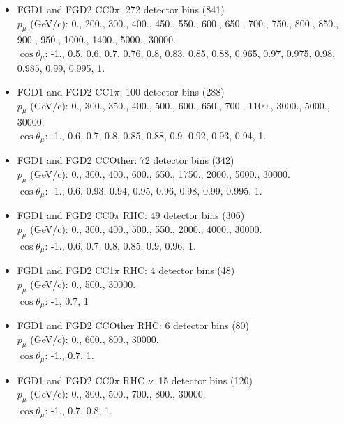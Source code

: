 \begin{itemize}
  \item FGD1 and FGD2 CC0$\pi$: 272 detector bins (841) \\
    $p_\mu$ (GeV/c): 0., 200., 300., 400., 450., 550., 600., 650., 700., 750., 800., 850., 900., 950., 1000., 1400., 5000., 30000. \\
    $\cos\theta_\mu$: -1., 0.5, 0.6, 0.7, 0.76, 0.8, 0.83, 0.85, 0.88, 0.965, 0.97, 0.975, 0.98, 0.985, 0.99, 0.995, 1. \\

  \item FGD1 and FGD2 CC1$\pi$: 100 detector bins (288) \\
    $p_\mu$ (GeV/c): 0., 300., 350., 400., 500., 600., 650., 700., 1100., 3000., 5000., 30000. \\
    $\cos\theta_\mu$: -1., 0.6, 0.7, 0.8, 0.85, 0.88, 0.9, 0.92, 0.93, 0.94, 1. \\

  \item FGD1 and FGD2 CCOther: 72 detector bins (342) \\
    $p_\mu$ (GeV/c): 0., 300., 400., 600., 650., 1750., 2000., 5000., 30000. \\
    $\cos\theta_\mu$: -1., 0.6, 0.93, 0.94, 0.95, 0.96, 0.98, 0.99, 0.995, 1. \\

  \item FGD1 and FGD2 CC0$\pi$ RHC: 49 detector bins (306) \\
    $p_\mu$ (GeV/c): 0., 300., 400., 500., 550., 2000., 4000., 30000. \\
    $\cos\theta_\mu$: -1., 0.6, 0.7, 0.8, 0.85, 0.9, 0.96, 1. \\

  \item FGD1 and FGD2 CC1$\pi$ RHC: 4 detector bins (48) \\
    $p_\mu$ (GeV/c): 0., 500., 30000. \\
    $\cos\theta_\mu$: -1, 0.7, 1 \\

  \item FGD1 and FGD2 CCOther RHC: 6 detector bins (80) \\
    $p_\mu$ (GeV/c): 0., 600., 800., 30000. \\
    $\cos\theta_\mu$: -1., 0.7, 1. \\

  \item FGD1 and FGD2 CC0$\pi$ RHC $\nu$: 15 detector bins (120) \\
    $p_\mu$ (GeV/c): 0., 300., 500., 700., 800., 30000. \\
    $\cos\theta_\mu$: -1., 0.7, 0.8, 1. \\


\end{itemize}
